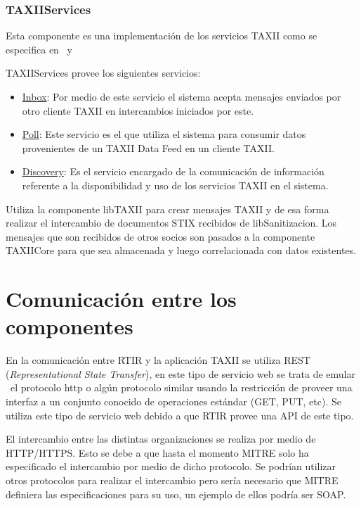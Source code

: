 	\subsubsection{TAXIIServices}
	Esta componente es una implementación de los servicios TAXII como se especifica en \cite{M13} \ y
		\ \cite{M14} 
	
	TAXIIServices provee los siguientes servicios:
	
	\begin{itemize}
		\item \underline{Inbox}: Por medio de este servicio el sistema acepta mensajes enviados por otro cliente
			TAXII en intercambios iniciados por este.
		\item \underline{Poll}: Este servicio es el que utiliza el sistema para consumir datos provenientes de un
			TAXII Data Feed en un cliente TAXII.
		\item \underline{Discovery}: Es el servicio encargado de la comunicación de información referente a la
			disponibilidad y uso de los servicios TAXII en el sistema.
	\end{itemize}
	
	\bigskip
	
	Utiliza la componente libTAXII para crear mensajes TAXII y de esa forma realizar el
		intercambio de documentos STIX recibidos de libSanitizacion. Los mensajes que son recibidos de otros socios son pasados
		a la componente TAXIICore para que sea almacenada y luego correlacionada con datos existentes.
	
	
	\bigskip
	
	\section{Comunicación entre los componentes}
	
	\bigskip
	
	En la comunicación entre RTIR y la aplicación TAXII se utiliza REST (\textit{Representational State
		Transfer}), en este tipo de servicio web se trata de emular \ el protocolo http o algún protocolo similar usando la
		restricción de proveer una interfaz a un conjunto conocido de operaciones estándar (GET, PUT, etc). Se utiliza este
		tipo de servicio web debido a que RTIR provee una API de este tipo.
	
	
	\bigskip
	
	El intercambio entre las distintas organizaciones se realiza por medio de HTTP/HTTPS. Esto se
		debe a que hasta el momento MITRE solo ha especificado el intercambio por medio de dicho protocolo. Se podrían utilizar
		otros protocolos para realizar el intercambio pero sería necesario que MITRE definiera las especificaciones para su
		uso, un ejemplo de ellos podría ser SOAP.

